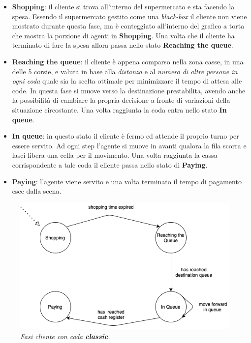 \begin{itemize}
    \item \textbf{Shopping}: il cliente si trova all'interno del supermercato e sta facendo la spesa. Essendo il supermercato gestito come una \textit{black-box} il cliente non viene mostrato durante questa fase, ma è conteggiato all'interno del grafico a torta che mostra la porzione di agenti in \textbf{Shopping}. Una volta che il cliente ha terminato di fare la spesa allora passa nello stato \textbf{Reaching the queue}.
    \item \textbf{Reaching the queue}: il cliente è appena comparso nella zona casse, in una delle 5 corsie, e valuta in base alla \textit{distanza} e al \textit{numero di altre persone in ogni coda} quale sia la scelta ottimale per minimizzare il tempo di attesa alle code. In questa fase si muove verso la destinazione prestabilita, avendo anche la possibilità di cambiare la propria decisione a fronte di variazioni della situazione circostante. Una volta raggiunta la coda entra nello stato \textbf{In queue}.
    \item \textbf{In queue}: in questo stato il cliente è fermo ed attende il proprio turno per essere servito. Ad ogni step l'agente si muove in avanti qualora la fila scorra e lasci libera una cella per il movimento. Una volta raggiunta la cassa corrispondente a tale coda il cliente passa nello stato di \textbf{Paying}.
    \item \textbf{Paying}: l'agente viene servito e una volta terminato il tempo di pagamento esce dalla scena.
\end{itemize}

\begin{figure}[h!]
    \includegraphics[width=\linewidth]{img/FSM-phases-classic.png}
    \centering
    \caption{\textit{Fasi cliente con coda \textbf{classic}.}}
\end{figure}

